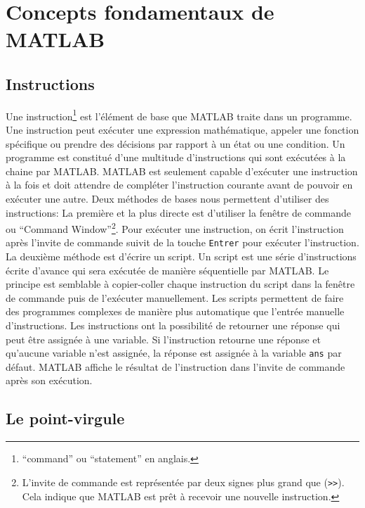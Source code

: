 \documentclass[]{tufte-handout}
\begin{document}
\hypertarget{concepts-fondamentaux-de-matlab}{%
\section{Concepts fondamentaux de
MATLAB}\label{concepts-fondamentaux-de-matlab}}

\hypertarget{instructions}{%
\subsection{Instructions}\label{instructions}}

Une instruction\footnote{``command'' ou ``statement'' en anglais.} est
l'élément de base que MATLAB traite dans un programme. Une instruction
peut exécuter une expression mathématique, appeler une fonction
spécifique ou prendre des décisions par rapport à un état ou une
condition. Un programme est constitué d'une multitude d'instructions qui
sont exécutées à la chaine par MATLAB. MATLAB est seulement capable
d'exécuter une instruction à la fois et doit attendre de compléter
l'instruction courante avant de pouvoir en exécuter une autre. Deux
méthodes de bases nous permettent d'utiliser des instructions: La
première et la plus directe est d'utiliser la fenêtre de commande ou
``Command Window''\footnote{L'invite de commande est représentée par
  deux signes plus grand que (\texttt{\textgreater{}\textgreater{}}).
  Cela indique que MATLAB est prêt à recevoir une nouvelle instruction.}.
Pour exécuter une instruction, on écrit l'instruction après l'invite de
commande suivit de la touche \texttt{Entrer} pour exécuter
l'instruction. La deuxième méthode est d'écrire un script. Un script est
une série d'instructions écrite d'avance qui sera exécutée de manière
séquentielle par MATLAB. Le principe est semblable à copier-coller
chaque instruction du script dans la fenêtre de commande puis de
l'exécuter manuellement. Les scripts permettent de faire des programmes
complexes de manière plus automatique que l'entrée manuelle
d'instructions. Les instructions ont la possibilité de retourner une
réponse qui peut être assignée à une variable. Si l'instruction retourne
une réponse et qu'aucune variable n'est assignée, la réponse est
assignée à la variable \texttt{ans} par défaut. MATLAB affiche le
résultat de l'instruction dans l'invite de commande après son exécution.

\hypertarget{le-point-virgule}{%
\subsection{Le point-virgule}\label{le-point-virgule}}
\end{document}
